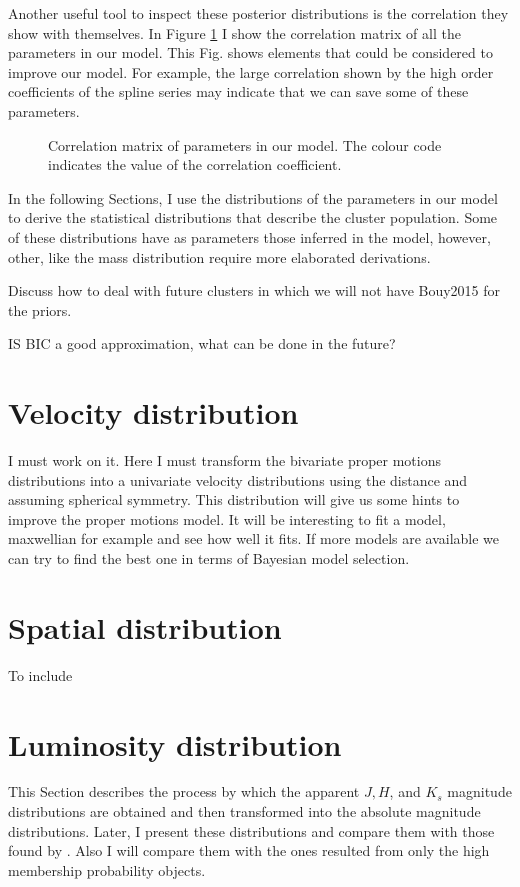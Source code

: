Another useful tool to inspect these posterior distributions is the correlation they show with themselves. In Figure \ref{fig:correlations} I show the correlation matrix of all the parameters in our model. This Fig. shows elements that could be considered to improve our model. 
For example, the large correlation shown by the high order coefficients of the spline series may indicate that we can save some of these parameters.   

\begin{figure}[htbp]
\begin{center}
\caption{Correlation matrix of parameters in our model. The colour code indicates the value of the correlation coefficient.}
\label{fig:correlations}
\end{center}
\end{figure}

In the following Sections, I use the distributions of the parameters in our model to derive the statistical distributions that describe the cluster population. Some of these distributions have as parameters those inferred in the model, however, other, like the mass distribution require more elaborated derivations.  

Discuss how to deal with future clusters in which we will not have Bouy2015 for the priors.

IS BIC a good approximation, what can be done in the future?

\section{Velocity distribution}
I must work on it. Here I must transform the bivariate proper motions distributions into a univariate velocity distributions using the distance and assuming spherical symmetry. This distribution will give us some hints to improve the proper motions model. It will be interesting to fit a model, maxwellian for example and see how well it fits. If more models are available we can try to find the best one in terms of Bayesian model selection. 
\section{Spatial distribution}
To include
\section{Luminosity distribution}
\label{sect:luminosity}
This Section describes the process by which the apparent $J,H$, and $K_s$ magnitude distributions are obtained and then transformed into the absolute magnitude distributions. Later, I present  these distributions and compare them with those found by \citet{Bouy2015}. Also I will compare them with the ones resulted from only the high membership probability objects.
